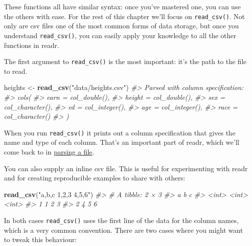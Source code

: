 \documentclass[]{book}
\newenvironment{Shaded}{\begin{snugshade}}{\end{snugshade}}
\newcommand{\KeywordTok}[1]{\textcolor[rgb]{0.13,0.29,0.53}{\textbf{{#1}}}}
\newcommand{\StringTok}[1]{\textcolor[rgb]{0.31,0.60,0.02}{{#1}}}
\newcommand{\CommentTok}[1]{\textcolor[rgb]{0.56,0.35,0.01}{\textit{{#1}}}}
\newcommand{\NormalTok}[1]{{#1}}
\begin{document}
These functions all have similar syntax: once you've mastered one, you
can use the others with ease. For the rest of this chapter we'll focus
on \texttt{read\_csv()}. Not only are csv files one of the most common
forms of data storage, but once you understand \texttt{read\_csv()}, you
can easily apply your knowledge to all the other functions in readr.

The first argument to \texttt{read\_csv()} is the most important: it's
the path to the file to read.

\begin{Shaded}
\begin{Highlighting}[]
\NormalTok{heights <-}\StringTok{ }\KeywordTok{read_csv}\NormalTok{(}\StringTok{"data/heights.csv"}\NormalTok{)}
\CommentTok{#> Parsed with column specification:}
\CommentTok{#> cols(}
\CommentTok{#>   earn = col_double(),}
\CommentTok{#>   height = col_double(),}
\CommentTok{#>   sex = col_character(),}
\CommentTok{#>   ed = col_integer(),}
\CommentTok{#>   age = col_integer(),}
\CommentTok{#>   race = col_character()}
\CommentTok{#> )}
\end{Highlighting}
\end{Shaded}

When you run \texttt{read\_csv()} it prints out a column specification
that gives the name and type of each column. That's an important part of
readr, which we'll come back to in
\protect\hyperlink{parsing-a-file}{parsing a file}.

You can also supply an inline csv file. This is useful for experimenting
with readr and for creating reproducible examples to share with others:

\begin{Shaded}
\begin{Highlighting}[]
\KeywordTok{read_csv}\NormalTok{(}\StringTok{"a,b,c}
\StringTok{1,2,3}
\StringTok{4,5,6"}\NormalTok{)}
\CommentTok{#> # A tibble: 2 × 3}
\CommentTok{#>       a     b     c}
\CommentTok{#>   <int> <int> <int>}
\CommentTok{#> 1     1     2     3}
\CommentTok{#> 2     4     5     6}
\end{Highlighting}
\end{Shaded}

In both cases \texttt{read\_csv()} uses the first line of the data for
the column names, which is a very common convention. There are two cases
where you might want to tweak this behaviour:
\end{document}
